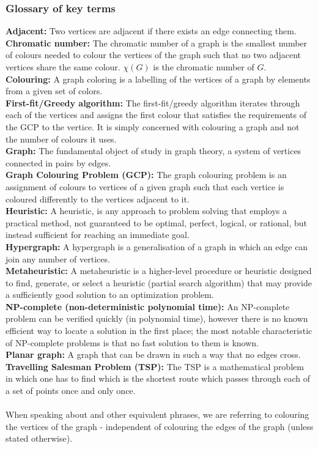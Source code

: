 \documentclass[12pt, a4paper]{article}
\begin{document}
\subsubsection*{Glossary of key terms}
\textbf{Adjacent:} Two vertices are adjacent if there exists an edge connecting them.\\
\textbf{Chromatic number:} The chromatic number of a graph is the smallest number of colours needed to colour the vertices of the graph such that no two adjacent vertices share the same colour. $\chi(G)$ is the chromatic number of $G$. \\
\textbf{Colouring:} A graph coloring is a labelling of the vertices of a graph by elements from a given set of colors.\\
\textbf{First-fit/Greedy algorithm:} The first-fit/greedy algorithm iterates through each of the vertices and assigns the first colour that satisfies the requirements of the GCP to the vertice. It is simply concerned with colouring a graph and not the number of colours it uses.\\
\textbf{Graph:} The fundamental object of study in graph theory, a system of vertices connected in pairs by edges.\\
\textbf{Graph Colouring Problem (GCP):} The graph colouring problem is an assignment of colours to vertices of a given graph such that each vertice is coloured differently to the vertices adjacent to it.\\
\textbf{Heuristic:} A heuristic, is any approach to problem solving that employs a practical method, not guaranteed to be optimal, perfect, logical, or rational, but instead sufficient for reaching an immediate goal.\\
\textbf{Hypergraph:} A hypergraph is a generalisation of a graph in which an edge can join any number of vertices.\\
\textbf{Metaheuristic:} A metaheuristic is a higher-level procedure or heuristic designed to find, generate, or select a heuristic (partial search algorithm) that may provide a sufficiently good solution to an optimization problem. \\ 
\textbf{NP-complete (non-deterministic polynomial time):}  An NP-complete problem can be verified quickly (in polynomial time), however there is no known efficient way to locate a solution in the first place; the most notable characteristic of NP-complete problems is that no fast solution to them is known.\\ 
\textbf{Planar graph:} A graph that can be drawn in such a way that no edges cross.\\
\textbf{Travelling Salesman Problem (TSP):} The TSP is a mathematical problem in which one has to find which is the shortest route which passes through each of a set of points once and only once.\\ \\
When speaking about  and other equivalent phrases, we are referring to colouring the vertices of the graph - independent of colouring the edges of the graph (unless stated otherwise).
\end{document}
